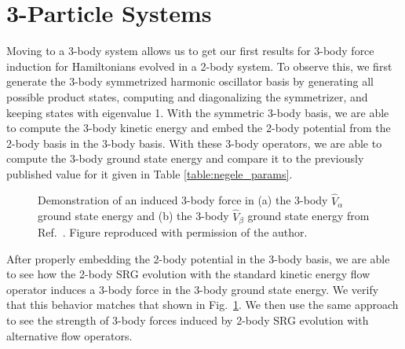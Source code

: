 \section{3-Particle Systems}

Moving to a 3-body system allows us to get our first results for 3-body force induction for Hamiltonians evolved in a 2-body system. To observe this, we first generate the 3-body symmetrized harmonic oscillator basis by generating all possible product states, computing and diagonalizing the symmetrizer, and keeping states with eigenvalue 1. With the symmetric 3-body basis, we are able to compute the 3-body kinetic energy and embed the 2-body potential from the 2-body basis in the 3-body basis. With these 3-body operators, we are able to compute the 3-body ground state energy and compare it to the previously published value for it given in Table \ref{table:negele_params}.

\begin{figure}[t]
\begin{center}
\hfill
{}
\end{center}
\caption{Demonstration of an induced 3-body force in (a) the 3-body $\hat{V}_\alpha$ ground state energy and (b) the 3-body $\hat{V}_\beta$ ground state energy from Ref.~\cite{Jurgenson:2008jp}. Figure reproduced with permission of the author.}
\label{fig:jurg_vfull}
\end{figure}

After properly embedding the 2-body potential in the 3-body basis, we are able to see how the 2-body SRG evolution with the standard kinetic energy flow operator induces a 3-body force in the 3-body ground state energy. We verify that this behavior matches that shown in Fig.~\ref{fig:jurg_vfull}. We then use the same approach to see the strength of 3-body forces induced by 2-body SRG evolution with alternative flow operators.

